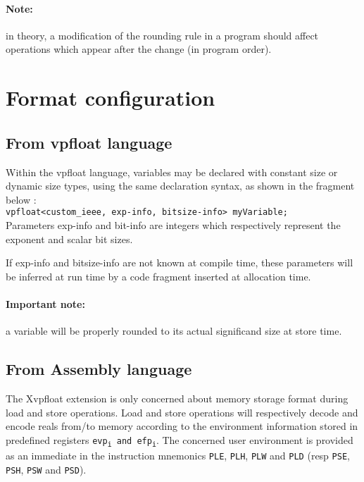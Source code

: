 \paragraph{Note:} in theory, a modification of the rounding rule in a program should affect operations which appear after the change (in program order).

\section{Format configuration}

\subsection{From vpfloat language}
Within the vpfloat language, variables may be declared with constant size or dynamic size types, using the same declaration syntax, as shown in the fragment below :\\
\texttt{vpfloat<custom\_ieee, exp-info, bitsize-info> myVariable;} \\

Parameters exp-info and bit-info are integers which respectively represent the exponent and scalar bit sizes.

If exp-info and bitsize-info are not known at compile time, these parameters will be inferred at run time by a code fragment inserted at allocation time.

\paragraph{Important note:} a variable will be properly rounded to its actual significand size at store time.

\subsection{From Assembly language}
The Xvpfloat extension is only concerned about memory storage format during load and store operations.
Load and store operations will respectively decode and encode reals from/to memory according to the environment information stored in predefined registers \texttt{evp\textsubscript{i} and efp\textsubscript{i}}.
The concerned user environment is provided as an immediate in the instruction mnemonics \texttt{PLE}, \texttt{PLH}, \texttt{PLW} and \texttt{PLD} (resp \texttt{PSE}, \texttt{PSH}, \texttt{PSW} and \texttt{PSD}).

